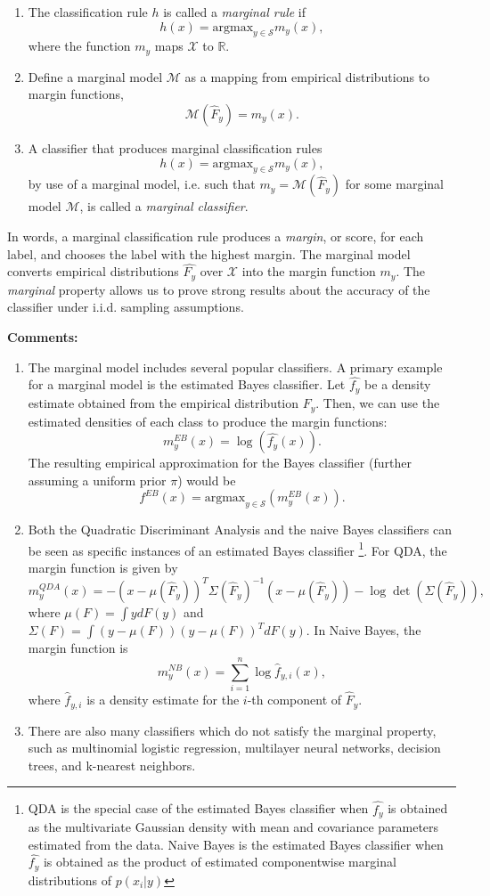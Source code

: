 \documentclass[12pt]{article}
\begin{document}
\begin{definition}
\begin{enumerate}
\item The classification rule $h$ is called a \emph{marginal rule} if 
\[
h(x) = \text{argmax}_{y \in \mathcal{S}} m_y(x),
\]
where the function $m_y$ maps $\mathcal{X}$ to $\mathbb{R}$. 
\item Define a marginal model $\mathcal{M}$ as a mapping from empirical distributions
to margin functions,
\[
\mathcal{M}(\hat{F}_y) = m_y(x).
\]
\item A classifier that produces marginal classification rules
\[
h(x) = \text{argmax}_{y \in \mathcal{S}} m_y(x),
\]
by use of a marginal model, i.e. such that
$m_y=\mathcal{M}(\hat{F}_y)$ for some marginal model $\mathcal{M}$,
is called a \emph{marginal classifier}.
\end{enumerate}
\end{definition}
In words, a marginal classification rule produces a \emph{margin}, or
score, for each label, and chooses the label with the highest
margin. The marginal model converts empirical distributions
$\hat{F_y}$ over $\mathcal{X}$ into the margin function
$m_y$.  The \emph{marginal} property allows us to prove strong results
about the accuracy of the classifier under i.i.d. sampling assumptions.

\textbf{Comments:}
\begin{enumerate}
\item The marginal model includes several popular classifiers.
A primary example for a marginal model is the estimated Bayes
classifier. Let $\hat{f_y}$ be a density estimate obtained from the
empirical distribution $\hat{F_y}$. Then, we can use the estimated
densities of each class to produce the margin functions:
\[ m^{EB}_y(x) = \log(\hat{f_{y}}(x)).\]
The resulting empirical approximation for the Bayes classifier
(further assuming a uniform prior $\pi$) would be
\[ f^{EB}(x) = \text{argmax}_{y \in \mathcal{S}}(m^{EB}_y(x)).\]
\item Both the Quadratic Discriminant Analysis and the naive Bayes classifiers can be seen as specific instances of an estimated Bayes classifier
\footnote{QDA is the special case of the estimated Bayes classifier when $\hat{f_y}$ is obtained as
the multivariate Gaussian density with mean and covariance parameters estimated from the data.
Naive Bayes is the estimated Bayes classifier when $\hat{f_y}$ is obtained as the product of estimated componentwise marginal distributions
of $p(x_i|y)$}. 
For QDA, the margin function is
given by
\[
m_y^{QDA}(x) = -(x - \mu(\hat{F}_y))^T \Sigma(\hat{F}_y)^{-1} (x-\mu(\hat{F}_y)) - \log\det(\Sigma(\hat{F}_y)),
\]
where $\mu(F) = \int y dF(y)$ and $\Sigma(F) = \int (y-\mu(F))(y-\mu(F))^T dF(y)$.
In Naive Bayes, the margin function is
\[
m^{NB}_y(x) = \sum_{i=1}^n \log \hat{f}_{y, i}(x),
\]
where $\hat{f}_{y, i}$ is a density estimate for the $i$-th component of
$\hat{F}_y$.
\item There are also many classifiers which do not satisfy the marginal property, such as multinomial logistic regression,
multilayer neural networks, decision trees, and k-nearest neighbors.
\end{enumerate}
\end{document}
